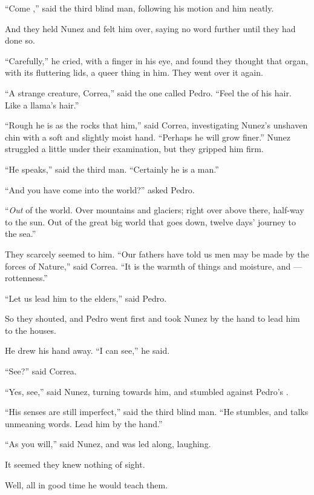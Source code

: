 \documentclass{fiche}
\begin{document}
\begin{texte}
``Come ,'' said the third blind man, following his
motion and  him neatly.

And they held Nunez and felt him over, saying no word further until they had done so.

``Carefully,'' he cried, with a finger in his eye, and found they thought that organ, with
its fluttering lids, a queer thing in him. They went over it again.

``A strange creature, Correa,'' said the one called Pedro. ``Feel the
 of his hair. Like a llama's hair.''

``Rough he is as the rocks that  him,'' said Correa,
investigating Nunez's unshaven chin with a soft and slightly moist hand. ``Perhaps he will
grow finer.'' Nunez struggled a little under their examination, but they gripped him firm.

``He speaks,'' said the third man. ``Certainly he is a man.''

``And you have come into the world?'' asked Pedro.

``\emph{Out} of the world. Over mountains and glaciers; right over above there, half-way to
the sun. Out of the great big world that goes down, twelve days' journey to the sea.''

They scarcely seemed to  him. ``Our fathers have told
us men may be made by the forces of Nature,'' said Correa. ``It is the warmth of things and
moisture, and  --- rottenness.''

``Let us lead him to the elders,'' said Pedro.

So they shouted, and Pedro went first and took Nunez by the hand to lead him to the houses.

He drew his hand away. ``I can see,'' he said.

``See?'' said Correa.

``Yes, see,'' said Nunez, turning towards him, and stumbled against Pedro's
.

``His senses are still imperfect,'' said the third blind man. ``He stumbles, and talks
unmeaning words. Lead him by the hand.''

``As you will,'' said Nunez, and was led along, laughing.

It seemed they knew nothing of sight.

Well, all in good time he would teach them.
\end{texte}
\end{document}
